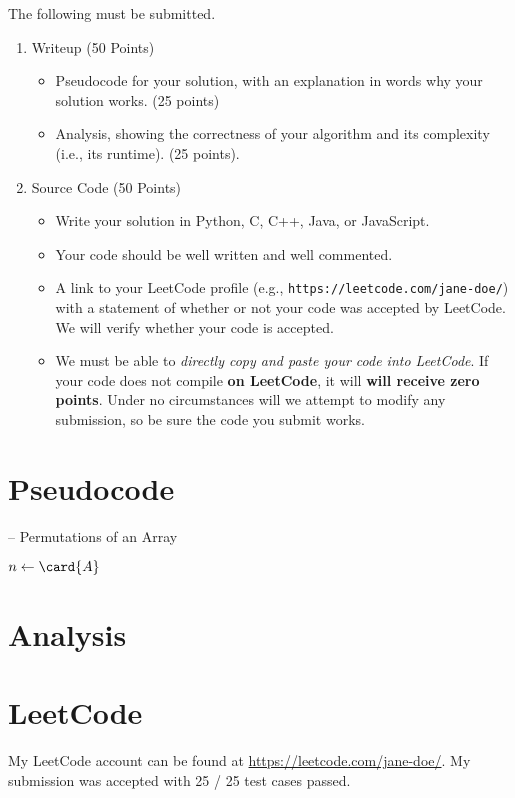 \documentclass[draft]{article}
\begin{document}
\begin{titlepage}
    The following must be submitted.
    \begin{enumerate}[label=\textbf{(\alph*)}]
        \item Writeup (50 Points)
              \begin{itemize}
                  \item Pseudocode for your solution, with an explanation in words why your solution works. (25 points)
                  \item Analysis, showing the correctness of your algorithm and its  complexity (i.e., its runtime). (25 points).
              \end{itemize}
               \item Source Code (50 Points)
              \begin{itemize}
                  \item Write your solution in Python, C, C++, Java, or JavaScript.
                  \item Your code should be well written and well commented.
                   \item A link to your LeetCode profile (e.g., \texttt{https://leetcode.com/jane-doe/}) with a statement of whether or not your code was accepted by LeetCode. We will verify whether your code is accepted.
                  \item We must be able to \emph{directly copy and paste your code into LeetCode}. If your code does not compile \textbf{on LeetCode}, it will \textbf{will receive zero points}. Under no circumstances will we attempt to modify any submission, so be sure the code you submit works.
              \end{itemize}
    \end{enumerate}
\end{titlepage}

\section{Pseudocode}
\begin{algorithm}[H]
    \caption[]{ -- Permutations of an Array }
    \label{alg:permutations}
    \begin{algorithmic}[1]
        \State $n\gets\card{A}$
        \Else {}
        \EndIf
        \EndFunction
    \end{algorithmic}
\end{algorithm}
\section{Analysis}

\section{LeetCode}
My LeetCode account can be found at \url{https://leetcode.com/jane-doe/}. My submission was accepted with 25 / 25 test cases passed.
\end{document}
